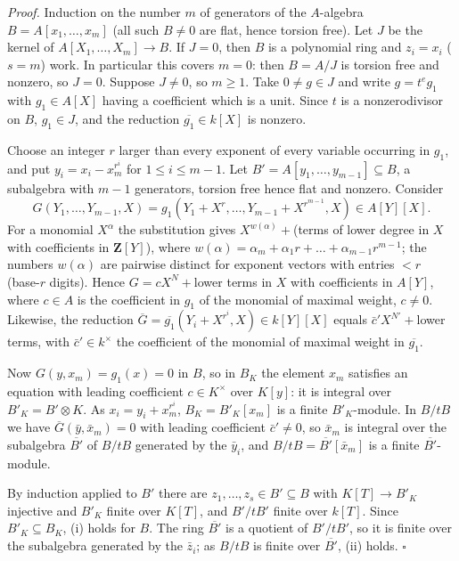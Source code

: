 \documentclass[11pt]{article}
\begin{document}
\emph{Proof.} Induction on the number $m$ of generators of the $A$-algebra $B=A[x_1,\dots,x_m]$ (all such $B\neq0$ are flat, hence torsion free). Let $J$ be the kernel of $A[X_1,\dots,X_m]\to B$. If $J=0$, then $B$ is a polynomial ring and $z_i=x_i$ ($s=m$) work. In particular this covers $m=0$: then $B=A/J$ is torsion free and nonzero, so $J=0$. Suppose $J\neq0$, so $m\ge1$. Take $0\neq g\in J$ and write $g=t^eg_1$ with $g_1\in A[X]$ having a coefficient which is a unit. Since $t$ is a nonzerodivisor on $B$, $g_1\in J$, and the reduction $\overline{g_1}\in k[X]$ is nonzero.

Choose an integer $r$ larger than every exponent of every variable occurring in $g_1$, and put $y_i=x_i-x_m^{r^i}$ for $1\le i\le m-1$. Let $B'=A[y_1,\dots,y_{m-1}]\subseteq B$, a subalgebra with $m-1$ generators, torsion free hence flat and nonzero. Consider
\[ G(Y_1,\dots,Y_{m-1},X)=g_1(Y_1+X^{r},\dots,Y_{m-1}+X^{r^{m-1}},X)\in A[Y][X]. \]
For a monomial $X^\alpha$ the substitution gives $X^{w(\alpha)}+{}$(terms of lower degree in $X$ with coefficients in $\mathbf Z[Y]$), where $w(\alpha)=\alpha_m+\alpha_1r+\dots+\alpha_{m-1}r^{m-1}$; the numbers $w(\alpha)$ are pairwise distinct for exponent vectors with entries $<r$ (base-$r$ digits). Hence $G=cX^N+{}$lower terms in $X$ with coefficients in $A[Y]$, where $c\in A$ is the coefficient in $g_1$ of the monomial of maximal weight, $c\neq0$. Likewise, the reduction $\overline G=\overline{g_1}(Y_i+X^{r^i},X)\in k[Y][X]$ equals $\bar c'X^{N'}+{}$lower terms, with $\bar c'\in k^\times$ the coefficient of the monomial of maximal weight in $\overline{g_1}$.

Now $G(y,x_m)=g_1(x)=0$ in $B$, so in $B_K$ the element $x_m$ satisfies an equation with leading coefficient $c\in K^\times$ over $K[y]$: it is integral over $B'_K=B'\otimes K$. As $x_i=y_i+x_m^{r^i}$, $B_K=B'_K[x_m]$ is a finite $B'_K$-module. In $B/tB$ we have $\overline G(\bar y,\bar x_m)=0$ with leading coefficient $\bar c'\neq0$, so $\bar x_m$ is integral over the subalgebra $\overline{B'}$ of $B/tB$ generated by the $\bar y_i$, and $B/tB=\overline{B'}[\bar x_m]$ is a finite $\overline{B'}$-module.

By induction applied to $B'$ there are $z_1,\dots,z_s\in B'\subseteq B$ with $K[T]\to B'_K$ injective and $B'_K$ finite over $K[T]$, and $B'/tB'$ finite over $k[T]$. Since $B'_K\subseteq B_K$, (i) holds for $B$. The ring $\overline{B'}$ is a quotient of $B'/tB'$, so it is finite over the subalgebra generated by the $\bar z_i$; as $B/tB$ is finite over $\overline{B'}$, (ii) holds. \hfill$\square$
\end{document}
